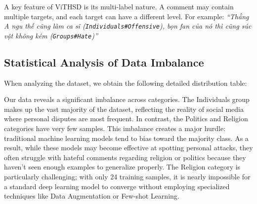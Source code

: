 \documentclass[11pt]{article}
\begin{document}
A key feature of ViTHSD is its multi-label nature. A comment may contain multiple targets, and
each target can have a different level. For example:
\foreignlanguage{vietnamese}{\textit{``Thằng A ngu thế cũng làm ca sĩ
(\texttt{Individuals\#Offensive}), bọn fan của nó thì cũng súc vật không kém
(\texttt{Groups\#Hate})''}} 

\subsection{Statistical Analysis of Data Imbalance}
When analyzing the dataset, we obtain the following detailed distribution table:

\begin{table}[ht]
\centering
\setlength{\tabcolsep}{3pt}
\footnotesize
\caption{Distribution of samples by Target (Train/Dev/Test)}
\label{tab:target_dist}
\end{table}
Our data reveals a significant imbalance across categories. The Individuals group makes up
the vast majority of the dataset, reflecting the reality of social media where personal disputes
are most frequent. In contrast, the Politics and Religion categories have very few samples.
This imbalance creates a major hurdle: traditional machine learning models tend to bias
toward the majority class. As a result, while these models may become effective at spotting
personal attacks, they often struggle with hateful comments regarding religion or politics
because they haven't seen enough examples to generalize properly. The Religion category is
particularly challenging; with only 24 training samples, it is nearly impossible for a standard
deep learning model to converge without employing specialized techniques like Data
Augmentation or Few-shot Learning.
\end{document}
